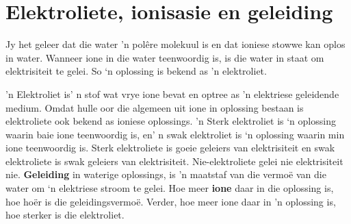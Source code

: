             \section{Elektroliete, ionisasie en geleiding}
            \nopagebreak
      \label{m38720*id338608}Jy het geleer dat die water 'n polêre molekuul is en dat ioniese stowwe kan oplos in water.
Wanneer ione in die water teenwoordig is, is die water in staat om elektrisiteit te gelei. So ‘n oplossing is bekend as 'n elektroliet.\par 
\label{m38720*fhsst!!!underscore!!!id635}
 {'n Elektroliet is' n stof wat vrye ione bevat en optree as 'n elektriese geleidende medium. Omdat hulle oor die algemeen uit ione in oplossing bestaan is elektroliete ook bekend as ioniese oplossings.  } 
'n Sterk elektroliet is ‘n oplossing waarin baie ione teenwoordig is, en' n swak elektroliet is ‘n oplossing waarin min ione teenwoordig is. Sterk elektroliete is goeie geleiers van elektrisiteit en swak elektroliete is swak geleiers van elektrisiteit. Nie-elektroliete gelei nie elektrisiteit nie.
\textbf{Geleiding} in waterige oplossings, is 'n maatstaf van die vermoë van die water om ‘n elektriese stroom te gelei. Hoe meer \textbf{ione} daar in die oplossing is, hoe hoër is die geleidingsvermoë.  Verder, hoe meer ione daar in 'n oplossing is, hoe sterker is die elektroliet. 
      \label{m38720*uid56}

